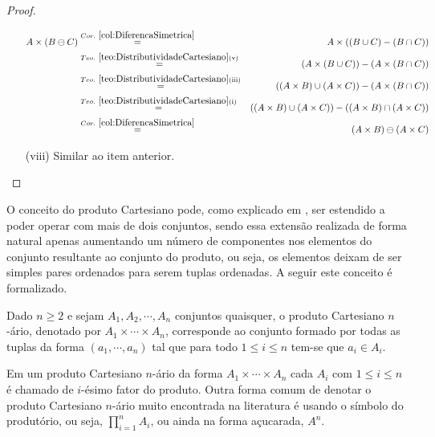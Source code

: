 \begin{proof}
\begin{itemize}
		\begin{eqnarray*}
			A \times (B \ominus C) & \stackrel{Cor. \ \ref{col:DiferencaSimetrica}}{=} & A \times ((B \cup C) - (B \cap C))\\
			& \stackrel{Teo. \ \ref{teo:DistributividadeCartesiano}(\text{v})}{=} & (A \times (B \cup C)) - (A \times (B \cap C))\\
			& \stackrel{Teo. \ \ref{teo:DistributividadeCartesiano}(\text{iii})}{=} & ((A \times B) \cup (A \times C)) - (A \times (B \cap C))\\
			& \stackrel{Teo. \ \ref{teo:DistributividadeCartesiano}(\text{i})}{=} & ((A \times B) \cup (A \times C)) - ((A \times B) \cap (A \times C))\\
			& \stackrel{Cor. \ \ref{col:DiferencaSimetrica}}{=} & (A \times B) \ominus (A \times C)
		\end{eqnarray*}
		\item[(viii)] Similar ao item anterior.
	\end{itemize}
\end{proof}

O conceito do produto Cartesiano pode, como explicado em \cite{lipschutz1978-TC, lipschutz2013-MD}, ser estendido a poder operar com mais de dois conjuntos, sendo essa extensão realizada de forma natural apenas aumentando um número de componentes nos elementos do conjunto resultante ao conjunto do produto, ou seja, os elementos deixam de ser simples pares ordenados para serem tuplas ordenadas. A seguir este conceito é formalizado.

\begin{definicao}\label{def:Cartesianonario}
	Dado $n \geq 2$ e sejam $A_1, A_2, \cdots, A_n$ conjuntos quaisquer, o produto Cartesiano $n$-ário, denotado por $A_1 \times \cdots \times A_n$, corresponde ao conjunto formado por todas as tuplas da forma $(a_1, \cdots, a_n)$ tal que para todo $1 \leq i \leq n$ tem-se que $a_i \in A_i$.
\end{definicao}

Em um produto Cartesiano $n$-ário da forma $A_1 \times \cdots \times A_n$ cada $A_i$ com $1 \leq i \leq n$ é chamado de $i$-ésimo fator do produto. Outra forma comum de denotar o produto Cartesiano $n$-ário muito encontrada na literatura é usando o símbolo do produtório, ou seja, $\displaystyle\prod_{i = 1}^{n} A_i$, ou ainda na forma açucarada, $A^n$.

